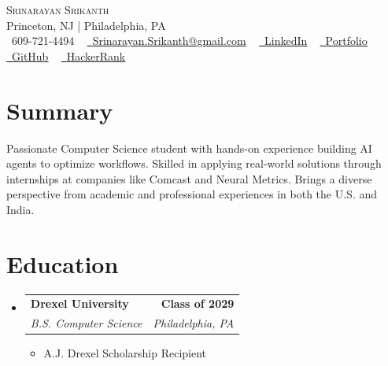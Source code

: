 \documentclass[letterpaper,10.8pt]{article} %
\makeatletter
\newcommand{\resumeItem}[1]{
  \item\small{#1}
}
\newcommand{\resumeSubheading}[4]{
  \vspace{-3pt}\item
    \begin{tabular*}{1.0\textwidth}[t]{l@{\extracolsep{\fill}}r}
      \textbf{#1} & \textbf{\small #2} \\
      \textit{\small#3} & \textit{\small #4} \\
    \end{tabular*}\vspace{-6pt}
}
\newcommand{\resumeSubHeadingListStart}{\begin{itemize}[leftmargin=0.0in, label={}, itemsep=1pt]}
\newcommand{\resumeSubHeadingListEnd}{\end{itemize}}
\newcommand{\resumeItemListStart}{\begin{itemize}[leftmargin=*, itemsep=1pt]}
\newcommand{\resumeItemListEnd}{\end{itemize}\vspace{-4pt}}
\makeatother
\begin{document}
\begin{center}
    {\Huge \scshape Srinarayan Srikanth} \\ \vspace{1pt}
    Princeton, NJ | Philadelphia, PA \\ \vspace{1pt}
    \small \raisebox{-0.1\height}\faPhone\ 609-721-4494 ~ 
    \href{mailto:Srinarayan.Srikanth@gmail.com}{\raisebox{-0.2\height}\faEnvelope\ \underline{Srinarayan.Srikanth@gmail.com}} ~ 
    \href{https://www.linkedin.com/in/srinarayan-srikanth-bb2750259/}{\raisebox{-0.2\height}\faLinkedin\ \underline{LinkedIn}} ~
    \href{https://srisrikanth.com/}{\raisebox{-0.2\height}\faGlobe\ \underline{Portfolio}} ~
    \href{https://github.com/SriSrik123}{\raisebox{-0.2\height}\faGithub\ \underline{GitHub}} ~
    \href{https://www.hackerrank.com/profile/hellosri2006}{\raisebox{-0.2\height}\faCode\ \underline{HackerRank}}
    \vspace{-8pt}
\end{center}


\section{Summary}
Passionate Computer Science student with hands-on experience building AI agents to optimize workflows. Skilled in applying real-world solutions through internships at companies like Comcast and Neural Metrics. Brings a diverse perspective from academic and professional experiences in both the U.S. and India.

\section{Education}
  \resumeSubHeadingListStart
    \resumeSubheading
      {Drexel University}{Class of 2029}
      {B.S. Computer Science}{Philadelphia, PA}
      \resumeItemListStart
        \resumeItem{A.J. Drexel Scholarship Recipient}
      \resumeItemListEnd
  \resumeSubHeadingListEnd

\end{document}
